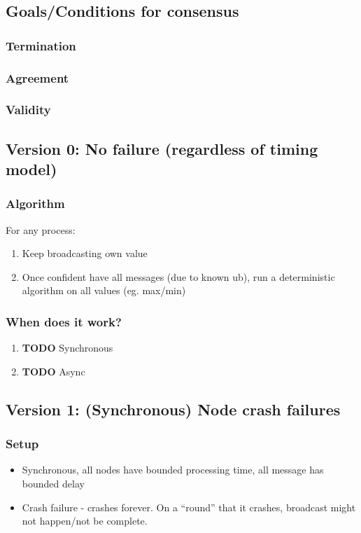 \documentclass[11pt]{article}
\begin{document}
\subsection{Goals/Conditions for consensus}
\label{sec:org14e5ae4}
\subsubsection{Termination}
\label{sec:org288ea4c}
\subsubsection{Agreement}
\label{sec:org1574847}
\subsubsection{Validity}
\label{sec:org0e32ccf}
\subsection{Version 0: No failure (regardless of timing model)}
\label{sec:org1e318af}
\subsubsection{Algorithm}
\label{sec:orgb907115}
For any process:
\begin{enumerate}
  \item Keep broadcasting own value
  \item Once confident have all messages (due to known ub), run a deterministic
        algorithm on all values (eg. max/min)
\end{enumerate}
\subsubsection{When does it work?}
\label{sec:org9d9ccb8}
\begin{enumerate}
  \item {\bfseries\sffamily TODO} Synchronous
        \label{sec:orgccd72eb}
  \item {\bfseries\sffamily TODO} Async
        \label{sec:orgbe157ed}
\end{enumerate}
\subsection{Version 1: (Synchronous) Node crash failures}
\label{sec:org67b2133}
\subsubsection{Setup}
\label{sec:org0f51323}
\begin{itemize}
  \item Synchronous, all nodes have bounded processing time, all message has bounded
        delay
  \item Crash failure - crashes forever. On a ``round'' that it crashes, broadcast might
        not happen/not be complete.
\end{itemize}
\end{document}
